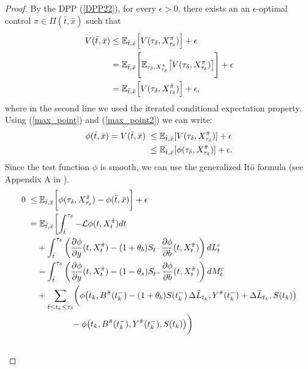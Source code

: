 \begin{proof}
By the DPP (\ref{DPP22}), for every $\epsilon > 0$, there exists an an $\epsilon$-optimal control $\pi \in \Pi(\bar t,\bar x)$ such that
\begin{align}
  V(\bar t, \bar x) & \leq \mathbb{E}_{\bar t, \bar x} \Bigl[ V(\tau_{\delta}, X^{\pi}_{\tau_{\delta}}) \Bigr] +\epsilon \\ \nonumber
                    &= \mathbb{E}_{\bar t, \bar x} \Biggl[ \mathbb{E}_{\tau_{\delta}, X^{\tilde \pi}_{\tau_{\delta}}} \bigl[ V(\tau_{\delta}, X^{\pi}_{\tau_{\delta}}) \bigr] \Biggr] +\epsilon \\ \nonumber
                    &= \mathbb{E}_{\bar t, \bar x} \Bigl[ V(\tau_{\delta}, X^{\tilde \pi}_{\tau_{\delta}}) \Bigr] +\epsilon,
\end{align}
where in the second line we used the iterated conditional expectation property.
Using (\ref{max_point}) and (\ref{max_point2}) we can write:
\begin{align*}
 \phi(\bar t, \bar x) = V(\bar t, \bar x) \; & \leq \mathbb{E}_{\bar t, \bar x}[V(\tau_{\delta}, X^{\tilde \pi}_{\tau_{\delta}})] + \epsilon \\  
 & \leq \mathbb{E}_{\bar t, \bar x}[\phi(\tau_{\delta}, X^{\tilde \pi}_{\tau_{\delta}})] + \epsilon.
\end{align*}
Since the test function $\phi$ is smooth, we can use the generalized It\=o formula (see Appendix A in \cite{OkSu01}).
\begin{align}\label{first_inequality}
 0 \; \leq & \; \E_{\bar t, \bar x} \biggl[ \phi(\tau_{\delta}, X^{\tilde \pi}_{\tau_{\delta}}) - \phi(\bar t, \bar x) \biggr] + \epsilon \\ \nonumber
    = & \; \E_{\bar t, \bar x} \biggl[ \int_{\bar t}^{\tau_{\delta}} -\LL \phi(t,X^{\tilde \pi}_t) dt \\ \nonumber
    & + \int_{\bar t}^{\tau_{\delta}} \left(\frac{\partial \phi}{\partial y}(t, X^{\tilde \pi}_t) -(1+\theta_b) S_{t^-} \frac{\partial \phi}{\partial b}( t, X^{\tilde \pi}_t)\right) dL^c_t \\ \nonumber
    & - \int_{\bar t}^{\tau_{\delta}} \left(\frac{\partial \phi}{\partial y}( t, X^{\tilde \pi}_t)-(1-\theta_s) S_{t^-} \frac{\partial \phi}{\partial b}( t, X^{\tilde \pi}_t)\right) dM^c_t \\ \nonumber
    & + \sum_{\bar t \leq t_k \leq \tau_{\delta}} \biggl( \phi \bigl( t_k, B^{\tilde \pi}(t_k^-) - (1+\theta_b) S(t_k^-)\, \Delta \tilde L_{t_k}, Y^{\tilde \pi}(t_k^-) 
      + \Delta \tilde L_{t_k}, S(t_k) \bigr) \\ \nonumber 
    & \hspace{4em} - \phi \bigl(t_k, B^{\tilde \pi}(t_k^-), Y^{\tilde \pi}(t_k^-), S(t_k) \bigr) \biggr) \\ \nonumber

\end{align}
\end{proof}
